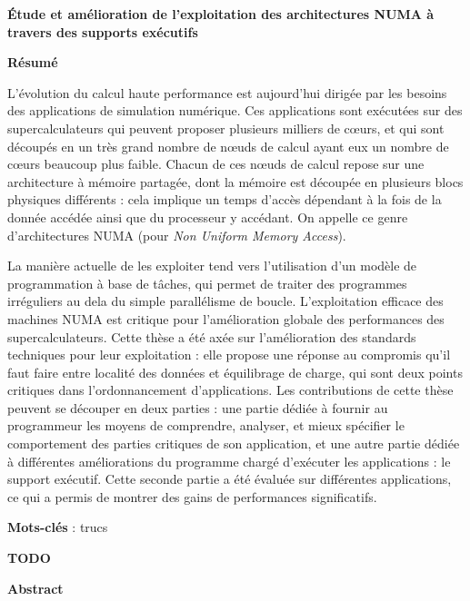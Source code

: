 \MakeUGthesePDG

\clearpage
\ifodd\value{page}\hbox{}\newpage\fi

\begin{center}\textbf{\large Étude et amélioration de l'exploitation des architectures NUMA à travers des supports exécutifs}

\quad

\textbf{Résumé}
\end{center}

L'évolution du calcul haute performance est aujourd'hui dirigée par les besoins des applications de simulation numérique.
Ces applications sont exécutées sur des supercalculateurs qui peuvent proposer plusieurs milliers de cœurs, et qui sont découpés en un très grand nombre de nœuds de calcul ayant eux un nombre de cœurs beaucoup plus faible.
Chacun de ces nœuds de calcul repose sur une architecture à mémoire partagée, dont la mémoire est découpée en plusieurs blocs physiques différents : cela implique un temps d'accès dépendant à la fois de la donnée accédée ainsi que du processeur y accédant.
On appelle ce genre d'architectures NUMA (pour \emph{Non Uniform Memory Access}).

La manière actuelle de les exploiter tend vers l'utilisation d'un modèle de programmation à base de tâches, qui permet de traiter des programmes irréguliers au dela du simple parallélisme de boucle.
L'exploitation efficace des machines NUMA est critique pour l'amélioration globale des performances des supercalculateurs.
Cette thèse a été axée sur l'amélioration des standards techniques pour leur exploitation : elle propose une réponse au compromis qu'il faut faire entre localité des données et équilibrage de charge, qui sont deux points critiques dans l'ordonnancement d'applications.
Les contributions de cette thèse peuvent se découper en deux parties : une partie dédiée à fournir au programmeur les moyens de comprendre, analyser, et mieux spécifier le comportement des parties critiques de son application, et une autre partie dédiée à différentes améliorations du programme chargé d'exécuter les applications : le support exécutif.
Cette seconde partie a été évaluée sur différentes applications, ce qui a permis de montrer des gains de performances significatifs.



\quad

\textbf{Mots-clés} : trucs

\begin{center}\textbf{\large TODO }

\quad

\textbf{Abstract}
\end{center}

